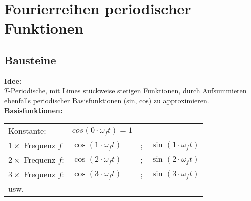 \section{Fourierreihen periodischer Funktionen}
	\subsection{Bausteine}
		\textbf{Idee:}\\[3pt]
		$T$-Periodische, mit Limes stückweise stetigen Funktionen, durch Aufsummieren ebenfalls periodischer Basisfunktionen
		(sin, cos) zu approximieren.\\[3pt]

		\textbf{Basisfunktionen:}\\[3pt]
		\begin{minipage}[t]{0.5\textwidth}
			\begin{tabular}{llll}
				Konstante: & $cos(0 \cdot \omega_{f} t) = 1$ & &\\[3pt]
				$1 \times$ Frequenz $f$  & $\cos(1 \cdot \omega_{f} t)$ & ; & $\sin(1 \cdot \omega_{f} t)$\\[3pt]
				$2 \times$ Frequenz $f$: & $\cos(2 \cdot \omega_{f} t)$ & ; & $\sin(2 \cdot \omega_{f} t)$\\[3pt]
				$3 \times$ Frequenz $f$: & $\cos(3 \cdot \omega_{f} t)$ & ; & $\sin(3 \cdot \omega_{f} t)$\\[3pt]
				usw. & & &\\[3pt]
			\end{tabular}
		\end{minipage}
		\begin{minipage}[t]{0.2\textwidth}
			
		\end{minipage}
		\begin{minipage}[t]{0.3\textwidth}
		\end{minipage}
	
